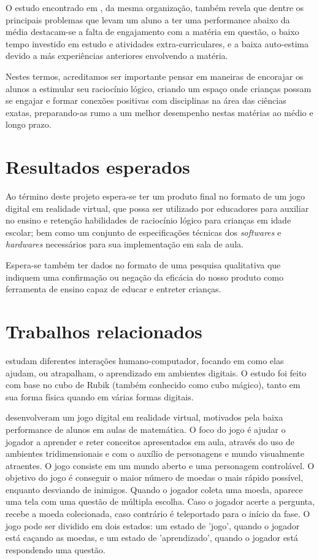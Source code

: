 O estudo encontrado em \cite{OECD:2016:low_performing_students}, 
da mesma organização, também revela que dentre os principais 
problemas que levam um aluno a ter uma performance abaixo da média 
destacam-se a falta de engajamento com a matéria em questão, 
o baixo tempo investido em estudo e atividades extra-curriculares, 
e a baixa auto-estima devido a más experiências anteriores 
envolvendo a matéria.

Nestes termos, acreditamos ser importante pensar em maneiras 
de encorajar os alunos a estimular seu raciocínio lógico, 
criando um espaço onde crianças possam se engajar e formar 
conexões positivas com disciplinas na área das ciências 
exatas, preparando-as rumo a um melhor desempenho nestas 
matérias ao médio e longo prazo.

\section{Resultados esperados}\label{sec-resultados-esperados}

Ao término deste projeto espera-se ter um produto final no 
formato de um jogo digital em realidade virtual, que possa 
ser utilizado por educadores para auxiliar no ensino e retenção 
habilidades de raciocínio lógico para crianças em idade escolar; 
bem como um conjunto de especificações técnicas dos 
\textit{softwares} e \textit{hardwares} necessários para sua 
implementação em sala de aula.

Espera-se também ter dados no formato de uma pesquisa 
qualitativa que indiquem uma confirmação ou negação da 
eficácia do nosso produto como ferramenta de ensino capaz 
de educar e entreter crianças.

\section{Trabalhos relacionados}\label{sec-trabalhos-relacionados}

\cite{Tabuti:2010:analise} estudam diferentes interações humano-computador, 
focando em como elas ajudam, ou atrapalham, o aprendizado em ambientes 
digitais. O estudo foi feito com base no cubo de Rubik 
(também conhecido como cubo mágico), tanto em sua forma física 
quando em várias formas digitais.

\cite{SBGames:2015:RVAM} desenvolveram um jogo digital em realidade 
virtual, motivados pela baixa performance de alunos em aulas de matemática. 
O foco do jogo é ajudar o jogador a aprender e reter conceitos apresentados 
em aula, através do uso de ambientes tridimensionais e com o auxílio de 
personagens e mundo visualmente atraentes. O jogo consiste em um mundo 
aberto e uma personagem controlável. O objetivo do jogo é conseguir o 
maior número de moedas o mais rápido possível, enquanto desviando de 
inimigos. Quando o jogador coleta uma moeda, aparece uma tela com uma questão 
de múltipla escolha. Caso o jogador acerte a pergunta, recebe a moeda 
colecionada, caso contrário é teleportado para o início da fase. O jogo pode 
ser dividido em dois estados: um estado de 'jogo', quando o jogador está 
caçando as moedas, e um estado de 'aprendizado', quando o jogador está 
respondendo uma questão.

